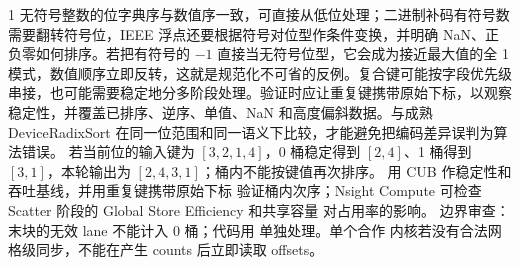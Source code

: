 \begin{solutionexercise}{1}
无符号整数的位字典序与数值序一致，可直接从低位处理；二进制补码有符号数需要翻转符号位，IEEE 浮点还要根据符号对位型作条件变换，并明确 NaN、正负零如何排序。若把有符号的 $-1$ 直接当无符号位型，它会成为接近最大值的全 1 模式，数值顺序立即反转，这就是规范化不可省的反例。复合键可能按字段优先级串接，也可能需要稳定地分多阶段处理。验证时应让重复键携带原始下标，以观察稳定性，并覆盖已排序、逆序、单值、NaN 和高度偏斜数据。与成熟 DeviceRadixSort 在同一位范围和同一语义下比较，才能避免把编码差异误判为算法错误。
\variantheading 若当前位的输入键为 $[3,2,1,4]$，0 桶稳定得到 $[2,4]$、1 桶得到
$[3,1]$，本轮输出为 $[2,4,3,1]$；桶内不能按键值再次排序。
\practiceheading 用 CUB  作稳定性和吞吐基线，并用重复键携带原始下标
验证桶内次序；Nsight Compute 可检查 Scatter 阶段的 Global Store Efficiency 和共享容量
对占用率的影响。
边界审查：末块的无效 lane 不能计入 0 桶；代码用  单独处理。单个合作
内核若没有合法网格级同步，不能在产生 counts 后立即读取 offsets。
\end{solutionexercise}

